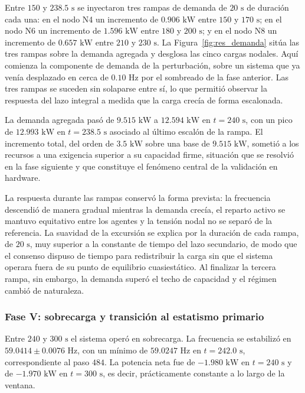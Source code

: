 Entre $150$ y $238.5\text{ s}$ se inyectaron tres rampas de demanda de $20\text{ s}$ de duración cada una: en el nodo N4 un incremento de $0.906\text{ kW}$ entre $150$ y $170\text{ s}$; en el nodo N6 un incremento de $1.596\text{ kW}$ entre $180$ y $200\text{ s}$; y en el nodo N8 un incremento de $0.657\text{ kW}$ entre $210$ y $230\text{ s}$. La Figura~\ref{fig:res_demanda} sitúa las tres rampas sobre la demanda agregada y desglosa las cinco cargas nodales. Aquí comienza la componente de demanda de la perturbación, sobre un sistema que ya venía desplazado en cerca de $0.10\text{ Hz}$ por el sombreado de la fase anterior. Las tres rampas se suceden sin solaparse entre sí, lo que permitió observar la respuesta del lazo integral a medida que la carga crecía de forma escalonada.

La demanda agregada pasó de $9.515\text{ kW}$ a $12.594\text{ kW}$ en $t = 240\text{ s}$, con un pico de $12.993\text{ kW}$ en $t = 238.5\text{ s}$ asociado al último escalón de la rampa. El incremento total, del orden de $3.5\text{ kW}$ sobre una base de $9.515\text{ kW}$, sometió a los recursos a una exigencia superior a su capacidad firme, situación que se resolvió en la fase siguiente y que constituye el fenómeno central de la validación en hardware.

La respuesta durante las rampas conservó la forma prevista: la frecuencia descendió de manera gradual mientras la demanda crecía, el reparto activo se mantuvo equitativo entre los agentes y la tensión nodal no se separó de la referencia. La suavidad de la excursión se explica por la duración de cada rampa, de $20\text{ s}$, muy superior a la constante de tiempo del lazo secundario, de modo que el consenso dispuso de tiempo para redistribuir la carga sin que el sistema operara fuera de su punto de equilibrio cuasiestático. Al finalizar la tercera rampa, sin embargo, la demanda superó el techo de capacidad y el régimen cambió de naturaleza.

\subsubsection{Fase V: sobrecarga y transición al estatismo primario}

Entre $240$ y $300\text{ s}$ el sistema operó en sobrecarga. La frecuencia se estabilizó en $59.0414 \pm 0.0076\text{ Hz}$, con un mínimo de $59.0247\text{ Hz}$ en $t = 242.0\text{ s}$, correspondiente al paso $484$. La potencia neta fue de $-1.980\text{ kW}$ en $t = 240\text{ s}$ y de $-1.970\text{ kW}$ en $t = 300\text{ s}$, es decir, prácticamente constante a lo largo de la ventana.

